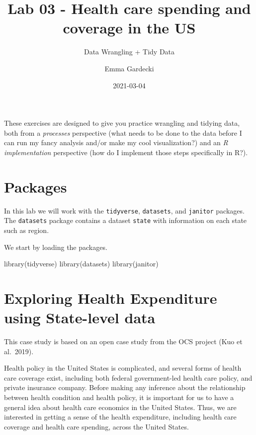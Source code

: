 \documentclass[
]{article}
\title{Lab 03 - Health care spending and coverage in the US}
\subtitle{Data Wrangling + Tidy Data}
\author{Emma Gardecki}
\date{2021-03-04}
\newenvironment{Shaded}{\begin{snugshade}}{\end{snugshade}}
\newcommand{\FunctionTok}[1]{\textcolor[rgb]{0.00,0.00,0.00}{#1}}
\newcommand{\NormalTok}[1]{#1}
\begin{document}
\maketitle

{
\setcounter{tocdepth}{2}
\tableofcontents
}
These exercises are designed to give you practice wrangling and tidying
data, both from a \emph{processes} perspective (what needs to be done to
the data before I can run my fancy analysis and/or make my cool
visualization?) and an \emph{R implementation} perspective (how do I
implement those steps specifically in R?).

\hypertarget{packages}{%
\section{Packages}\label{packages}}

In this lab we will work with the \texttt{tidyverse}, \texttt{datasets},
and \texttt{janitor} packages. The \texttt{datasets} package contains a
dataset \texttt{state} with information on each state such as region.

We start by loading the packages.

\begin{Shaded}
\begin{Highlighting}[]
\FunctionTok{library}\NormalTok{(tidyverse)}
\FunctionTok{library}\NormalTok{(datasets)}
\FunctionTok{library}\NormalTok{(janitor)}
\end{Highlighting}
\end{Shaded}

\hypertarget{exploring-health-expenditure-using-state-level-data}{%
\section{Exploring Health Expenditure using State-level
data}\label{exploring-health-expenditure-using-state-level-data}}

This case study is based on an open case study from the OCS project (Kuo
et al.~2019).

Health policy in the United States is complicated, and several forms of
health care coverage exist, including both federal government-led health
care policy, and private insurance company. Before making any inference
about the relationship between health condition and health policy, it is
important for us to have a general idea about health care economics in
the United States. Thus, we are interested in getting a sense of the
health expenditure, including health care coverage and health care
spending, across the United States.
\end{document}
